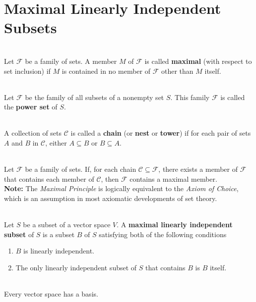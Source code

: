 \section{Maximal Linearly Independent Subsets}

\begin{definition}
	\hfill\\
	Let $\mathcal{F}$ be a family of sets. A member $M$ of $\mathcal{F}$ is called \textbf{maximal} (with respect to set inclusion) if $M$ is contained in no member of $\mathcal{F}$ other than $M$ itself.
\end{definition}

\begin{definition}
	\hfill\\
	Let $\mathcal{F}$ be the family of all subsets of a nonempty set $S$. This family $\mathcal{F}$ is called the \textbf{power set} of $S$.
\end{definition}

\begin{definition}
	\hfill\\
	A collection of sets $\mathcal{C}$ is called a \textbf{chain} (or \textbf{nest} or \textbf{tower}) if for each pair of sets $A$ and $B$ in $\mathcal{C}$, either $A \subseteq B$ or $B \subseteq A$.
\end{definition}

\begin{definition}
	\hfill\\
	Let $\mathcal{F}$ be a family of sets. If, for each chain $\mathcal{C} \subseteq \mathcal{F}$, there exists a member of $\mathcal{F}$ that contains each member of $\mathcal{C}$, then $\mathcal{F}$ contains a maximal member.\\

	\textbf{Note:} The \textit{Maximal Principle} is logically equivalent to the \textit{Axiom of Choice}, which is an assumption in most axiomatic developments of set theory.
\end{definition}

\begin{definition}
	\hfill\\
	Let $S$ be a subset of a vector space $V$. A \textbf{maximal linearly independent subset} of $S$ is a subset $B$ of $S$ satisfying both of the following conditions

	\begin{enumerate}
		\item $B$ is linearly independent.
		\item The only linearly independent subset of $S$ that contains $B$ is $B$ itself.
	\end{enumerate}
\end{definition}

\begin{corollary}
	\hfill\\
	Every vector space has a basis.
\end{corollary}
